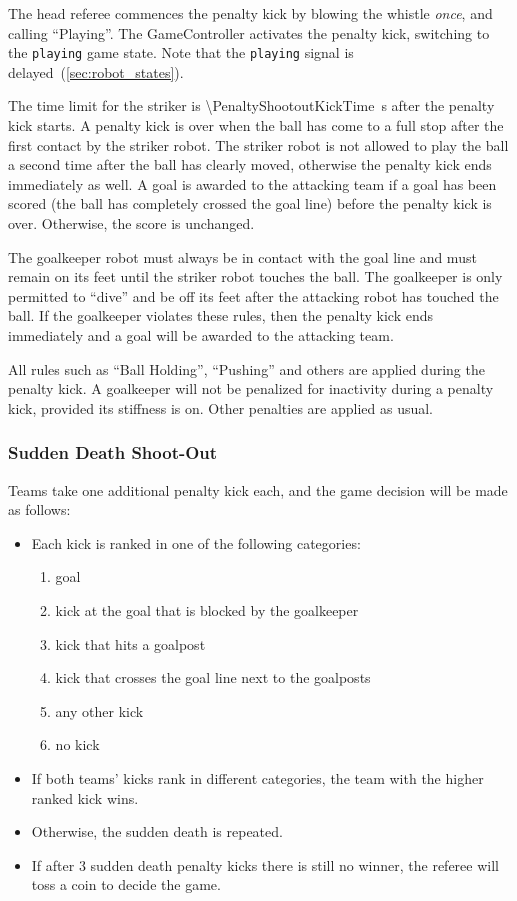 The head referee commences the penalty kick by blowing the whistle \textit{once}, and calling ``Playing''.
The GameController activates the penalty kick, switching to the \texttt{playing} game state.
Note that the \texttt{playing} signal is delayed~(\cf \cref{sec:robot_states}).

The time limit for the striker is \qty{\PenaltyShootoutKickTime}{\second} after the penalty kick starts.
A penalty kick is over when the ball has come to a full stop after the first contact by the striker robot.
The striker robot is not allowed to play the ball a second time after the ball has clearly moved, otherwise the penalty kick ends immediately as well.
A goal is awarded to the attacking team if a goal has been scored (\ie the ball has completely crossed the goal line) before the penalty kick is over.
Otherwise, the score is unchanged.

The goalkeeper robot must always be in contact with the goal line and must remain on its feet until the striker robot touches the ball.
The goalkeeper is only permitted to ``dive'' and be off its feet after the attacking robot has touched the ball.
If the goalkeeper violates these rules, then the penalty kick ends immediately and a goal will be awarded to the attacking team.

All rules such as ``Ball Holding'', ``Pushing'' and others are applied during the penalty kick.
A goalkeeper will not be penalized for inactivity during a penalty kick, provided its stiffness is on.
Other penalties are applied as usual.

\subsubsection{Sudden Death Shoot-Out}
\label{sec:sudden_death_shoot_out}

Teams take one additional penalty kick each, and the game decision will be made as follows:
\begin{itemize}
  \item Each kick is ranked in one of the following categories:
  \begin{enumerate}
    \item goal
    \item kick at the goal that is blocked by the goalkeeper
    \item kick that hits a goalpost
    \item kick that crosses the goal line next to the goalposts
    \item any other kick
    \item no kick
  \end{enumerate}
  \item If both teams' kicks rank in different categories, the team with the higher ranked kick wins.
  \item Otherwise, the sudden death is repeated.
  \item If after 3 sudden death penalty kicks there is still no winner, the referee will toss a coin to decide the game.
\end{itemize}